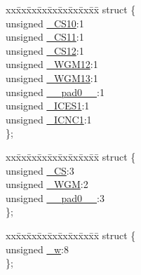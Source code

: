 \begin{DoxyCompactItemize}
\item 
\begin{tabbing}
xx\=xx\=xx\=xx\=xx\=xx\=xx\=xx\=xx\=\kill
struct \{\\
\>unsigned \hyperlink{union_____t_c_c_r1_bbits__t_ac67accf63ea95877003df71f4ac327a9}{\_CS10}:1\\
\>unsigned \hyperlink{union_____t_c_c_r1_bbits__t_ad1bc10536beb090e3b93707b418059ce}{\_CS11}:1\\
\>unsigned \hyperlink{union_____t_c_c_r1_bbits__t_ab8224372864f4dda1973f59bc2662c6b}{\_CS12}:1\\
\>unsigned \hyperlink{union_____t_c_c_r1_bbits__t_a69625c7e864a6bdbb5e3b62102d4fc2b}{\_WGM12}:1\\
\>unsigned \hyperlink{union_____t_c_c_r1_bbits__t_a12ffd3cc7eac0319c442e4c8f81047ac}{\_WGM13}:1\\
\>unsigned \hyperlink{union_____t_c_c_r1_bbits__t_ae9dd1e2ec844830422bd585483f7d422}{\_\_pad0\_\_}:1\\
\>unsigned \hyperlink{union_____t_c_c_r1_bbits__t_a138964a58b5f449e30f82c85bcd292d6}{\_ICES1}:1\\
\>unsigned \hyperlink{union_____t_c_c_r1_bbits__t_ac728f9f558a46bbc8b3b509ea3296201}{\_ICNC1}:1\\
\}; \\

\end{tabbing}\item 
\begin{tabbing}
xx\=xx\=xx\=xx\=xx\=xx\=xx\=xx\=xx\=\kill
struct \{\\
\>unsigned \hyperlink{union_____t_c_c_r1_bbits__t_a103327161bbf67990c5c99e4d468d805}{\_CS}:3\\
\>unsigned \hyperlink{union_____t_c_c_r1_bbits__t_a7776e68b8de59bb52ac6062226c30d9f}{\_WGM}:2\\
\>unsigned \hyperlink{union_____t_c_c_r1_bbits__t_ae9dd1e2ec844830422bd585483f7d422}{\_\_pad0\_\_}:3\\
\}; \\

\end{tabbing}\item 
\begin{tabbing}
xx\=xx\=xx\=xx\=xx\=xx\=xx\=xx\=xx\=\kill
struct \{\\
\>unsigned \hyperlink{union_____t_c_c_r1_bbits__t_af620642d160649b819fcbaf3a268f255}{\_w}:8\\
\}; \\

\end{tabbing}\end{DoxyCompactItemize}


